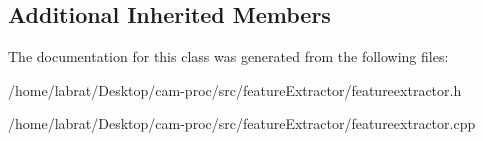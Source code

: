 \subsection*{Additional Inherited Members}


The documentation for this class was generated from the following files\+:\begin{DoxyCompactItemize}
\item 
/home/labrat/\+Desktop/cam-\/proc/src/feature\+Extractor/featureextractor.\+h\item 
/home/labrat/\+Desktop/cam-\/proc/src/feature\+Extractor/featureextractor.\+cpp\end{DoxyCompactItemize}
